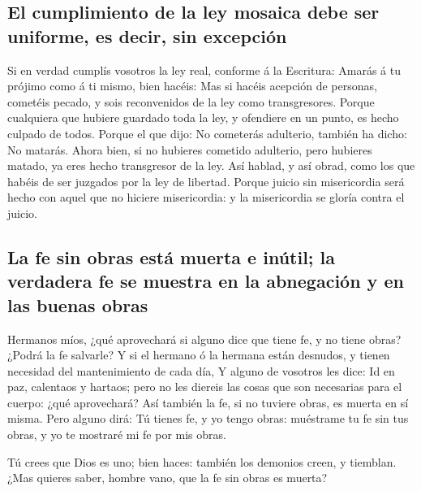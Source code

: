 \hypertarget{el-cumplimiento-de-la-ley-mosaica-debe-ser-uniforme-es-decir-sin-excepciuxf3n}{%
\subsection{El cumplimiento de la ley mosaica debe ser uniforme, es
decir, sin
excepción}\label{el-cumplimiento-de-la-ley-mosaica-debe-ser-uniforme-es-decir-sin-excepciuxf3n}}

 Si en verdad cumplís vosotros la ley real, conforme á la
Escritura: Amarás á tu prójimo como á ti mismo, bien hacéis:
 Mas si hacéis acepción de personas, cometéis pecado, y
sois reconvenidos de la ley como transgresores.  Porque
cualquiera que hubiere guardado toda la ley, y ofendiere en un punto, es
hecho culpado de todos.  Porque el que dijo: No cometerás
adulterio, también ha dicho: No matarás. Ahora bien, si no hubieres
cometido adulterio, pero hubieres matado, ya eres hecho transgresor de
la ley.  Así hablad, y así obrad, como los que habéis de
ser juzgados por la ley de libertad.  Porque juicio sin
misericordia será hecho con aquel que no hiciere misericordia: y la
misericordia se gloría contra el juicio.

\hypertarget{la-fe-sin-obras-estuxe1-muerta-e-inuxfatil-la-verdadera-fe-se-muestra-en-la-abnegaciuxf3n-y-en-las-buenas-obras}{%
\subsection{La fe sin obras está muerta e inútil; la verdadera fe se
muestra en la abnegación y en las buenas
obras}\label{la-fe-sin-obras-estuxe1-muerta-e-inuxfatil-la-verdadera-fe-se-muestra-en-la-abnegaciuxf3n-y-en-las-buenas-obras}}

 Hermanos míos, ¿qué aprovechará si alguno dice que tiene
fe, y no tiene obras? ¿Podrá la fe salvarle?  Y si el
hermano ó la hermana están desnudos, y tienen necesidad del
mantenimiento de cada día,  Y alguno de vosotros les
dice: Id en paz, calentaos y hartaos; pero no les diereis las cosas que
son necesarias para el cuerpo: ¿qué aprovechará?  Así
también la fe, si no tuviere obras, es muerta en sí misma.
 Pero alguno dirá: Tú tienes fe, y yo tengo obras:
muéstrame tu fe sin tus obras, y yo te mostraré mi fe por mis obras.

 Tú crees que Dios es uno; bien haces: también los
demonios creen, y tiemblan.  ¿Mas quieres saber, hombre
vano, que la fe sin obras es muerta?

